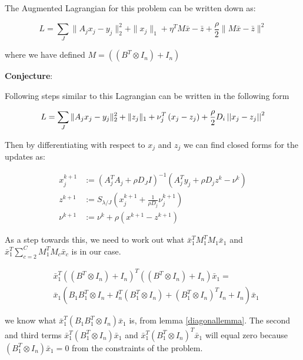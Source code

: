 \documentclass{article}
\begin{document}
The Augmented Lagrangian for this problem can be written down as:

\begin{equation}
L = \sum_J \|A_jx_j - y_j\|_2^2 + \|x_j\|_1 + \eta^T M \bar{x} - \bar{z} + \frac{\rho}{2}\|M\bar{x} - \bar{z}\|^2
\end{equation}

where we have defined \(M = \left(\left(B^T \otimes I_n\right) + I_n \right) \)

\textbf{Conjecture}:

Following steps similar to \cite{mota2013d} this Lagrangian can be written in the following form 

\begin{equation}
L = \sum_J \|A_jx_j - y_j\|_2^2 + \|z_j\|_1 + \nu_j^T \left(x_j-z_j\right) + \frac{\rho}{2}D_i\left|\left|x_j-z_j\right|\right|^2
\end{equation}

Then by differentiating with respect to \(x_j\) and \(z_j\) we  can find closed forms for the updates as:

\begin{align}
x_j^{k+1} &:= \left(A_j^TA_j + \rho D_J I\right)^{-1}\left(A_j^Ty_j +\rho D_j z^k - \nu^k\right)\\
z^{k+1} &:= S_{\lambda/J}\left(x_j^{k+1} + \frac{1}{\rho D_j}\nu_j^{k+1}\right)
 \\
\nu^{k+1} &:= \nu^{k} + \rho \left(x^{k+1}-z^{k+1}\right)
\label{dadmm_algo_lasso}
\end{align}

As a step towards this, we need to work out what \(\bar{x}_1^T  M_1^T M_1 \bar{x}_1\) and \(\bar{x}_1^T\sum_{c=2}^C M_1^TM_c\bar{x}_c\) is in our case.

\begin{align*}
&\bar{x}_1^T\left(\left(B^T \otimes I_n\right) + I_n \right)^T\left(\left(B^T \otimes I_n\right) + I_n \right)\bar{x}_1 = \\& \bar{x}_1\left(B_1B_1^T \otimes I_n + I_n^T\left(B_1^T \otimes I_n\right)
+ \left(B_1^T \otimes I_n\right)^TI_n + I_n\right)\bar{x}_1
\end{align*}

we know what \(\bar{x}_1^T\left(B_1B_1^T \otimes I_n\right)\bar{x}_1\) is, from lemma \ref{diagonallemma}. The second and third terms \(\bar{x}_1^T\left(B_1^T \otimes I_n\right)\bar{x}_1\) and \(\bar{x}_1^T\left(B_1^T \otimes I_n\right)^T\bar{x}_1\) will equal zero because \(\left(B_1^T \otimes I_n\right)\bar{x}_1 = 0 \) from the constraints of the problem.
\end{document}

